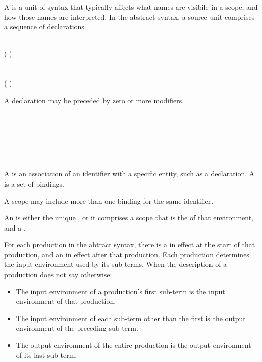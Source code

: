
A  is a unit of syntax that typically affects what names are visibile in a scope, and how those names are interpreted.
In the abstract syntax, a source unit comprises a sequence of declarations.

\begin{Syntax}
     \\
        (  \SynOr {} ) \SynOpt \\
         \SynStar \\
         \SynStar \\
        (  ) \SynStar
\end{Syntax}

A declaration may be preceded by zero or more modifiers.

\begin{Syntax}
     \\
          \\
    \SynOr {} \\
    \SynOr {} \\
    \SynOr {} \\
\end{Syntax}

A  is an association of an identifier with a specific entity, such as a declaration.
A  is a set of bindings.

\begin{Note}
A scope may include more than one binding for the same identifier.
\end{Note}

An  is either the unique , or it comprises a scope that is the  of that environment, and a .

For each production in the abtract syntax, there is a  in effect at the start of that production, and an  in effect after that production.
Each production determines the input environment used by its sub-terms.
When the description of a production does not say otherwise:

\begin{itemize}
\item The input environment of a production's first sub-term is the input environment of that production.
\item The input environment of each sub-term other than the first is the output environment of the preceding sub-term.
\item The output environment of the entire production is the output environment of its last sub-term.
\end{itemize}

